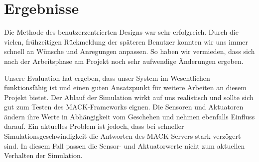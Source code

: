 



\section{Ergebnisse}\label{sec:eva_results}

Die Methode des benutzerzentrierten Designs war sehr erfolgreich. Durch die vielen, frühzeitigen Rückmeldung der späteren Benutzer konnten wir uns immer schnell an Wünsche und Anregungen anpassen. So haben wir vermieden, dass sich nach der Arbeitsphase am Projekt noch sehr aufwendige Änderungen ergeben.

Unsere Evaluation hat ergeben, dass unser System im Wesentlichen funktionsfähig ist und einen guten Ansatzpunkt für weitere Arbeiten an diesem Projekt bietet. Der Ablauf der Simulation wirkt auf uns realistisch und sollte sich gut zum Testen des MACK-Frameworks eignen. Die Sensoren und Aktuatoren ändern ihre Werte in Abhängigkeit vom Geschehen und nehmen ebenfalls Einfluss darauf. Ein aktuelles Problem ist jedoch, dass bei schneller Simulationsgeschwindigkeit die Antworten des MACK-Servers stark verzögert sind. In diesem Fall passen die Sensor- und Aktuatorwerte nicht zum aktuellen Verhalten der Simulation.




